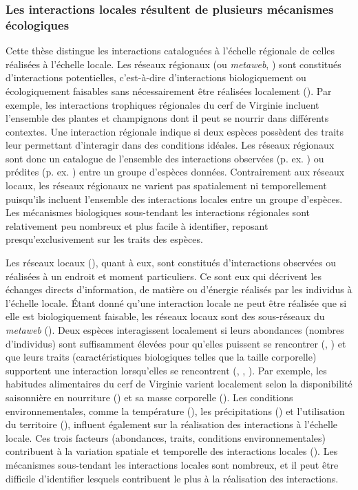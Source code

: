 \subsubsection{Les interactions locales résultent de plusieurs mécanismes écologiques} 

Cette thèse distingue les interactions cataloguées à l'échelle régionale de
celles réalisées à l'échelle locale. Les réseaux régionaux (ou \textit{metaweb},
\cite{Pascual2006Ecological}) sont constitués d'interactions potentielles,
c'est-à-dire d'interactions biologiquement ou écologiquement faisables sans
nécessairement être réalisées localement (\cite{Tylianakis2017Ecological}). Par
exemple, les interactions trophiques régionales du cerf de Virginie incluent
l'ensemble des plantes et champignons dont il peut se nourrir dans différents
contextes. Une interaction régionale indique si deux espèces possèdent des
traits leur permettant d'interagir dans des conditions idéales. Les réseaux
régionaux sont donc un catalogue de l'ensemble des interactions observées (p.
ex. \cite{Maiorano2020Tetraeu}) ou prédites (p. ex. \cite{Strydom2022Food})
entre un groupe d'espèces données. Contrairement aux réseaux locaux, les réseaux
régionaux ne varient pas spatialement ni temporellement puisqu'ils incluent
l'ensemble des interactions locales entre un groupe d'espèces. Les mécanismes
biologiques sous-tendant les interactions régionales sont relativement peu
nombreux et plus facile à identifier, reposant presqu'exclusivement sur les
traits des espèces. 

Les réseaux locaux (\cite{Poisot2012Dissimilarity}), quant à eux, sont
constitués d'interactions observées ou réalisées à un endroit et moment
particuliers. Ce sont eux qui décrivent les échanges directs d'information, de
matière ou d'énergie réalisés par les individus à l'échelle locale. Étant donné
qu'une interaction locale ne peut être réalisée que si elle est biologiquement
faisable, les réseaux locaux sont des sous-réseaux du \textit{metaweb}
(\cite{Saravia2022Ecological}). Deux espèces interagissent localement si leurs
abondances (nombres d'individus) sont suffisamment élevées pour qu'elles
puissent se rencontrer (\cite{Canard2012Emergence}, \cite{Canard2014Empirical})
et que leurs traits (caractéristiques biologiques telles que la taille
corporelle) supportent une interaction lorsqu'elles se rencontrent
(\cite{Bolnick2011Why}, \cite{Gravel2013Inferring}, \cite{Stouffer2011Role}).
Par exemple, les habitudes alimentaires du cerf de Virginie varient localement
selon la disponibilité saisonnière en nourriture (\cite{Short1975Nutrition}) et
sa masse corporelle (\cite{Luna2013Influence}). Les conditions
environnementales, comme la température (\cite{Angilletta2004Temperature}), les
précipitations (\cite{Woodward2012Climate}) et l'utilisation du territoire
(\cite{Tylianakis2007Habitat}), influent également sur la réalisation des
interactions à l'échelle locale. Ces trois facteurs (abondances, traits,
conditions environnementales) contribuent à la variation spatiale et temporelle
des interactions locales (\cite{Poisot2015Species}). Les mécanismes sous-tendant
les interactions locales sont nombreux, et il peut être difficile d'identifier
lesquels contribuent le plus à la réalisation des interactions. 

